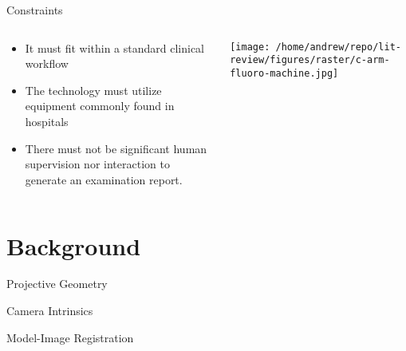 \documentclass[presentation]{beamer}
\begin{document}
\begin{frame}[label={sec:org4940220}]{Constraints}
\begin{columns}
\begin{column}{0.45\columnwidth}
\begin{itemize}
\item It must fit within a standard clinical workflow
\item The technology must utilize equipment commonly found in hospitals
\item There must not be significant human supervision nor interaction to generate an examination report.
\end{itemize}
\end{column}
\begin{column}{0.55\columnwidth}
\begin{center}
\texttt{[image: /home/andrew/repo/lit-review/figures/raster/c-arm-fluoro-machine.jpg]}
\end{center}
\end{column}
\end{columns}
\end{frame}
\section{Background}
\label{sec:org3b75111}
\begin{frame}[label={sec:org165d8e7}]{Projective Geometry}
\end{frame}
\begin{frame}[label={sec:org9f931d3}]{Camera Intrinsics}
\end{frame}
\begin{frame}[label={sec:orgcacc61f}]{Model-Image Registration}
\end{frame}
\end{document}
